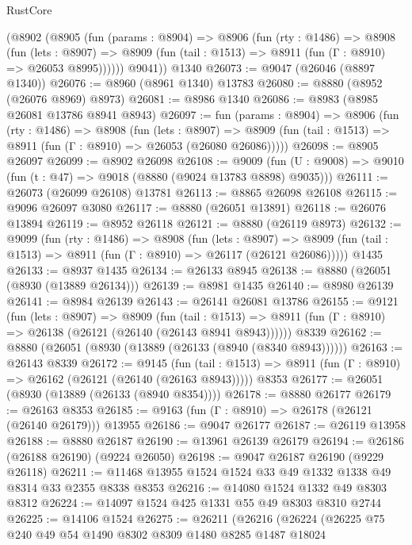 \begin{lexlean}{RustCore}
\begin{coremodule}
      (@8902
        (@8905
          (fun (params : @8904) =>
          @8906
            (fun (rty : @1486) =>
            @8908
              (fun (lets : @8907) =>
              @8909 (fun (tail : @1513) => @8911 (fun (Γ : @8910) => @26053 @8995))))))
        @9041))
    @1340
@26073 := @9047 (@26046 (@8897 @1340))
@26076 := @8960 (@8961 @1340) @13783
@26080 := @8880 (@8952 (@26076 @8969) @8973)
@26081 := @8986 @1340
@26086 := @8983 (@8985 @26081 @13786 @8941 @8943)
@26097 := fun (params : @8904) =>
  @8906
    (fun (rty : @1486) =>
    @8908
      (fun (lets : @8907) =>
      @8909 (fun (tail : @1513) => @8911 (fun (Γ : @8910) => @26053 (@26080 @26086)))))
@26098 := @8905 @26097
@26099 := @8902 @26098
@26108 := @9009
    (fun (U : @9008) => @9010 (fun (t : @47) => @9018 (@8880 (@9024 @13783 @8898) @9035)))
@26111 := @26073 (@26099 @26108) @13781
@26113 := @8865 @26098 @26108
@26115 := @9096 @26097 @3080
@26117 := @8880 (@26051 @13891)
@26118 := @26076 @13894
@26119 := @8952 @26118
@26121 := @8880 (@26119 @8973)
@26132 := @9099
    (fun (rty : @1486) =>
    @8908
      (fun (lets : @8907) =>
      @8909 (fun (tail : @1513) => @8911 (fun (Γ : @8910) => @26117 (@26121 @26086)))))
    @1435
@26133 := @8937 @1435
@26134 := @26133 @8945
@26138 := @8880 (@26051 (@8930 (@13889 @26134)))
@26139 := @8981 @1435
@26140 := @8980 @26139
@26141 := @8984 @26139
@26143 := @26141 @26081 @13786
@26155 := @9121
    (fun (lets : @8907) =>
    @8909
      (fun (tail : @1513) =>
      @8911 (fun (Γ : @8910) => @26138 (@26121 (@26140 (@26143 @8941 @8943))))))
    @8339
@26162 := @8880 (@26051 (@8930 (@13889 (@26133 (@8940 (@8340 @8943))))))
@26163 := @26143 @8339
@26172 := @9145
    (fun (tail : @1513) => @8911 (fun (Γ : @8910) => @26162 (@26121 (@26140 (@26163 @8943)))))
    @8353
@26177 := @26051 (@8930 (@13889 (@26133 (@8940 @8354))))
@26178 := @8880 @26177
@26179 := @26163 @8353
@26185 := @9163 (fun (Γ : @8910) => @26178 (@26121 (@26140 @26179))) @13955
@26186 := @9047 @26177
@26187 := @26119 @13958
@26188 := @8880 @26187
@26190 := @13961 @26139 @26179
@26194 := @26186 (@26188 @26190) (@9224 @26050)
@26198 := @9047 @26187 @26190 (@9229 @26118)
@26211 := @11468 @13955 @1524 @1524 @33 @49 @1332 @1338 @49 @8314 @33 @2355 @8338 @8353
@26216 := @14080 @1524 @1332 @49 @8303 @8312
@26224 := @14097 @1524 @425 @1331 @55 @49 @8303 @8310 @2744
@26225 := @14106 @1524
@26275 := @26211
    (@26216
      (@26224
        (@26225
          @75
          @240
          @49
          @54
          @1490
          @8302
          @8309
          @1480
          @8285
          @1487
          @18024

\end{coremodule}
\end{lexlean}

